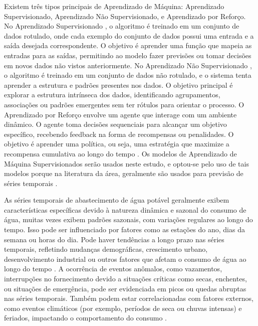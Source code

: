 Existem três tipos principais de Aprendizado de Máquina: Aprendizado Supervisionado, Aprendizado Não Supervisionado, e Aprendizado por Reforço. No Aprendizado Supervisionado \cite{LIU2023128730}, o algoritmo é treinado em um conjunto de dados rotulado, onde cada exemplo do conjunto de dados possui uma entrada e a saída desejada correspondente. O objetivo é aprender uma função que mapeia as entradas para as saídas, permitindo ao modelo fazer previsões ou tomar decisões em novos dados não vistos anteriormente. No Aprendizado Não Supervisionado \cite{WANG2022122747}, o algoritmo é treinado em um conjunto de dados não rotulado, e o sistema tenta aprender a estrutura e padrões presentes nos dados. O objetivo principal é explorar a estrutura intrínseca dos dados, identificando agrupamentos, associações ou padrões emergentes sem ter rótulos para orientar o processo. O Aprendizado por Reforço \cite{CHEN2023121710} envolve um agente que interage com um ambiente dinâmico. O agente toma decisões sequenciais para alcançar um objetivo específico, recebendo feedback na forma de recompensas ou penalidades. O objetivo é aprender uma política, ou seja, uma estratégia que maximize a recompensa cumulativa ao longo do tempo \cite{Silva2021}. Os modelos de Aprendizado de Máquina Supervisionados serão usados neste estudo, e optou-se pelo uso de tais modelos porque na literatura da área, geralmente são usados para previsão de séries temporais
\cite{UCCASTILLO2023105788}. 

As séries temporais de abastecimento de água potável geralmente exibem características específicas devido à natureza dinâmica e sazonal do consumo de água, muitas vezes exibem padrões sazonais, com variações regulares ao longo do tempo. Isso pode ser influenciado por fatores como as estações do ano, dias da semana ou horas do dia. Pode haver tendências a longo prazo nas séries temporais, refletindo mudanças demográficas, crescimento urbano, desenvolvimento industrial ou outros fatores que afetam o consumo de água ao longo do tempo \cite{JI2023129928}. A ocorrência de eventos anômalos, como vazamentos, interrupções no fornecimento devido a situações críticas como secas, enchentes, ou situações de emergência, pode ser evidenciada em picos ou quedas abruptas nas séries temporais. Também podem estar correlacionadas com fatores externos, como eventos climáticos (por exemplo, períodos de seca ou chuvas intensas) e feriados, impactando o comportamento do consumo \cite{BERGLUND2023104739}.

